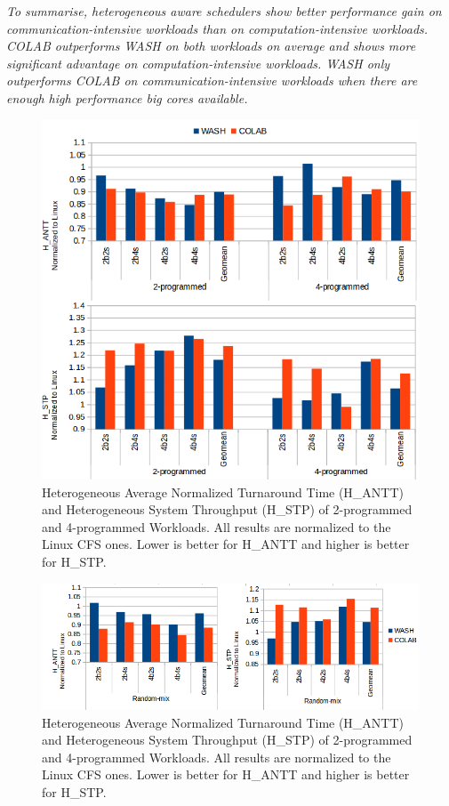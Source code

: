 \emph{To summarise, heterogeneous aware schedulers show better performance gain on communication-intensive workloads than on computation-intensive workloads. COLAB outperforms WASH on both workloads on average and shows more significant advantage on computation-intensive workloads. WASH only outperforms COLAB on communication-intensive workloads when there are enough high performance big cores available.}



\begin{figure}
\centering
\includegraphics[scale=0.35]{figures/nprog.png}
\caption{Heterogeneous Average Normalized Turnaround Time (H\_ANTT) and Heterogeneous System Throughput (H\_STP) of 2-programmed and 4-programmed Workloads. All results are normalized to the Linux CFS ones. Lower is better for H\_ANTT and higher is better for H\_STP.}
\label{nprog}
\end{figure} 

\begin{figure}
\centering
\includegraphics[scale=0.5]{figures/rand.png}
\caption{Heterogeneous Average Normalized Turnaround Time (H\_ANTT) and Heterogeneous System Throughput (H\_STP) of 2-programmed and 4-programmed Workloads. All results are normalized to the Linux CFS ones. Lower is better for H\_ANTT and higher is better for H\_STP.}
\label{rand}
\end{figure} 

